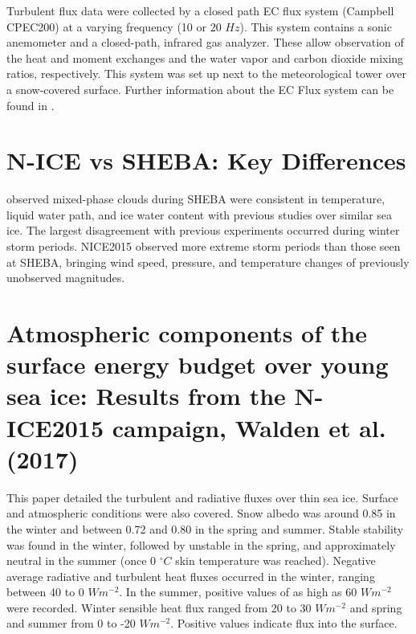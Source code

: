 Turbulent flux data were collected by a closed path EC flux system (Campbell CPEC200) at a varying frequency (10 or 20 $Hz$). This system contains a sonic anemometer and a closed-path, infrared gas analyzer. These allow observation of the heat and moment exchanges and the water vapor and carbon dioxide mixing ratios, respectively. This system was set up next to the meteorological tower over a snow-covered surface. Further information about the EC Flux system can be found in \citet{walden:2017}.


\section{N-ICE vs SHEBA: Key Differences}
\citet{shupe:2004} observed mixed-phase clouds during SHEBA were consistent in temperature, liquid water path, and ice water content with previous studies over similar sea ice. The largest disagreement with previous experiments occurred during winter storm periods. NICE2015 observed more extreme storm periods than those seen at SHEBA, bringing wind speed, pressure, and temperature changes of previously unobserved magnitudes. 

\section{Atmospheric components of the surface energy budget over young sea ice: Results from the N-ICE2015 campaign, Walden et al. (2017)}

This paper detailed the turbulent and radiative fluxes over thin sea ice. Surface and atmospheric conditions were also covered. Snow albedo was around 0.85 in the winter and between 0.72 and 0.80 in the spring and summer. Stable stability was found in the winter, followed by unstable in the spring, and approximately neutral in the summer (once 0 $^{\circ} C$ skin temperature was reached). Negative average radiative and turbulent heat fluxes occurred in the winter, ranging between 40 to 0 $Wm^{-2}$. In the summer, positive values of as high as 60 $Wm^{-2}$ were recorded. Winter sensible heat flux ranged from 20 to 30 $Wm^{-2}$ and spring and summer from 0 to -20 $Wm^{-2}$. Positive values indicate flux into the surface.

